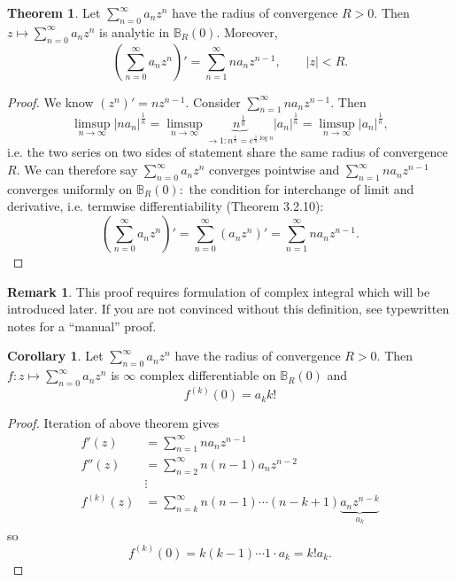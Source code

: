 \documentclass[a4paper]{article}
\theoremstyle{definition}
\newtheorem{thm}[defn]{Theorem}
\newtheorem{coro}[defn]{Corollary}
\newtheorem*{remark}{Remark}
\begin{document}
\begin{thm}
Let $\displaystyle \sum_{n=0}^\infty a_n z^n$ have the radius of convergence $R>0$. Then $\displaystyle z\mapsto \sum_{n=0}^\infty a_n z^n$ is analytic in $\mathbb B_R(0).$ Moreover,
\[
\left(\sum_{n=0}^\infty a_n z^n\right)' = \sum_{n=1}^\infty n a_n z^{n-1},\qquad |z|<R .
\]
\end{thm}
\begin{proof}
We know $(z^n)' = n z^{n-1}$. Consider $\displaystyle \sum_{n=1}^\infty n a_n z^{n-1}.$ Then
\[
\limsup_{n\rightarrow \infty} \left| n a_n \right|^{\frac1n} = \limsup_{n\rightarrow \infty} \underbrace{n^{\frac1n}}_{\rightarrow 1: n^{\frac1n} = e^{\frac1n \log n}} |a_n|^{\frac1n} = \limsup_{n\rightarrow \infty} |a_n|^{\frac1n},
\]
i.e. the two series on two sides of statement share the same radius of convergence $R$. We can therefore say $\displaystyle \sum_{n=0}^\infty a_n z^n$ converges pointwise and $\displaystyle \sum_{n=1}^\infty n a_n z^{n-1}$ converges uniformly on $\mathbb B_R(0):$ the condition for interchange of limit and derivative, i.e. termwise differentiability (Theorem 3.2.10):
\[
\left(\sum_{n=0}^\infty a_n z^n\right)' = \sum_{n=0}^\infty \left(a_n z^n\right)' = \sum_{n=1}^\infty n a_n z^{n-1}.
\]
\end{proof}
\begin{remark}
This proof requires formulation of complex integral which will be introduced later. If you are not convinced without this definition, see typewritten notes for a ``manual'' proof.
\end{remark}
\begin{coro}
Let $\displaystyle \sum_{n=0}^\infty a_n z^n$ have the radius of convergence $R>0$. Then $f:z\mapsto \displaystyle \sum_{n=0}^\infty a_n z^n$ is $\infty$ complex differentiable on $\mathbb B_R(0)$ and
\[
f^{(k)}(0) = a_k k!
\]
\end{coro}
\begin{proof}
Iteration of above theorem gives
\[
\begin{aligned}
f'(z) &= \sum_{n=1}^\infty n a_n z^{n-1} \\
f''(z) &= \sum_{n=2}^\infty n(n-1) a_n z^{n-2} \\
&\vdots \\
f^{(k)}(z) &= \sum_{n=k}^\infty n(n-1)\cdots (n-k+1) \underbrace{a_n z^{n-k}}_{a_k}
\end{aligned}
\]
so
\[
f^{(k)}(0) = k(k-1)\cdots 1 \cdot a_k = k! a_k.
\]
\end{proof}
\end{document}
